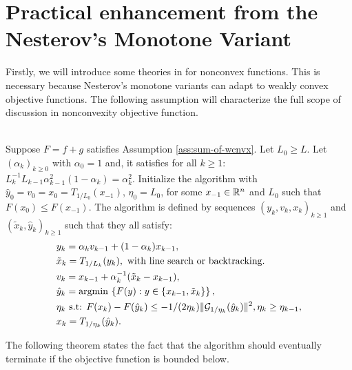 \documentclass[12pt]{report}
\begin{document}
    \section{Practical enhancement from the Nesterov's Monotone Variant}
        Firstly, we will introduce some theories in for nonconvex functions. 
        This is necessary because Nesterov's monotone variants can adapt to weakly convex objective functions. 
        The following assumption will characterize the full scope of discussion in nonconvexity objective function. 
        \begin{definition}\;\label{def:nes-monotone-scheme}\\
            Suppose $F = f + g$ satisfies Assumption \ref{ass:sum-of-wcnvx}. 
            Let $L_0 \ge L$. 
            Let $(\alpha_k)_{k \ge 0}$ with $\alpha_0 = 1$ and, it satisfies for all $k \ge 1$: $L_{k}^{-1}L_{k - 1}\alpha_{k - 1}^2(1 - \alpha_k) = \alpha_k^2$. 
            Initialize the algorithm with $\hat y_0 =v_0=x_0 = T_{1/L_0}(x_{-1})$, $\eta_0 = L_0$, for some $x_{-1} \in \mathbb R^n$ and $L_0$ such that $F(x_0) \le F(x_{-1})$. 
            The algorithm is defined by sequences $(y_k, v_k, x_k)_{k \ge 1}$ and $(\tilde x_k, \hat y_k)_{k \ge 1}$ such that they all satisfy: 
            $$
            \begin{aligned}
                &y_k = \alpha_k v_{k - 1} + (1 - \alpha_k)x_{k - 1},
                \\
                &\tilde x_k = T_{1/L_k}(y_k), \text{ with line search or backtracking. }
                \\
                &v_k = x_{k - 1} + \alpha_k^{-1}(\tilde x_k - x_{k - 1}),
                \\
                &\hat y_k = \mathop{\rm argmin}\limits{}\left\lbrace
                    F(y): y \in \{x_{k - 1}, \tilde x_k\}
                \right\rbrace,
                \\
                & \eta_{k}\text{ s.t: } F(x_k) - F(\hat y_k) \le - 1/(2\eta_k)\Vert \mathcal G_{1/\eta_k}(\hat y_k) \Vert^2, \eta_{k} \ge \eta_{k - 1}, 
                \\
                &x_k = T_{1/\eta_k}(\hat y_k) . 
            \end{aligned}
            $$
        \end{definition}
        The following theorem states the fact that the algorithm should eventually terminate if the objective function is bounded below. 
\end{document}
